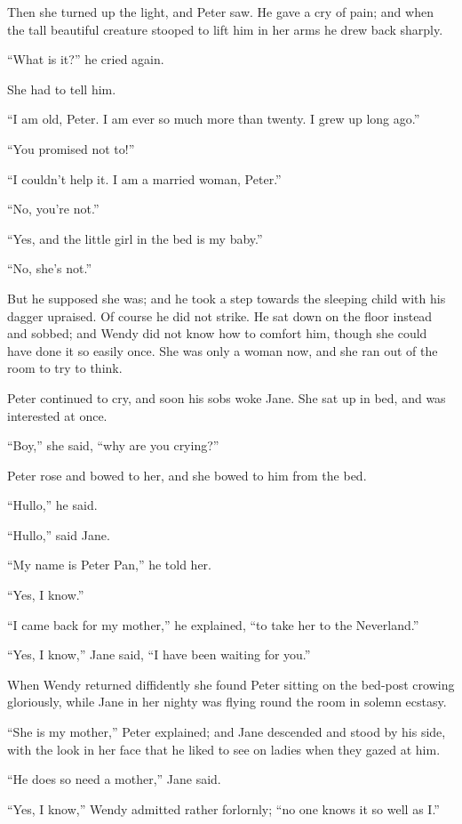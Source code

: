 Then she turned up the light, and Peter saw. He gave a cry of pain; and
when the tall beautiful creature stooped to lift him in her arms he
drew back sharply.

``What is it?'' he cried again.

She had to tell him.

``I am old, Peter. I am ever so much more than twenty. I grew up long
ago.''

``You promised not to!''

``I couldn't help it. I am a married woman, Peter.''

``No, you're not.''

``Yes, and the little girl in the bed is my baby.''

``No, she's not.''

But he supposed she was; and he took a step towards the sleeping child
with his dagger upraised. Of course he did not strike. He sat down on
the floor instead and sobbed; and Wendy did not know how to comfort
him, though she could have done it so easily once. She was only a woman
now, and she ran out of the room to try to think.

Peter continued to cry, and soon his sobs woke Jane. She sat up in bed,
and was interested at once.

``Boy,'' she said, ``why are you crying?''

Peter rose and bowed to her, and she bowed to him from the bed.

``Hullo,'' he said.

``Hullo,'' said Jane.

``My name is Peter Pan,'' he told her.

``Yes, I know.''

``I came back for my mother,'' he explained, ``to take her to the
Neverland.''

``Yes, I know,'' Jane said, ``I have been waiting for you.''

When Wendy returned diffidently she found Peter sitting on the bed-post
crowing gloriously, while Jane in her nighty was flying round the room
in solemn ecstasy.

``She is my mother,'' Peter explained; and Jane descended and stood by
his side, with the look in her face that he liked to see on ladies when
they gazed at him.

``He does so need a mother,'' Jane said.

``Yes, I know,'' Wendy admitted rather forlornly; ``no one knows it so
well as I.''

